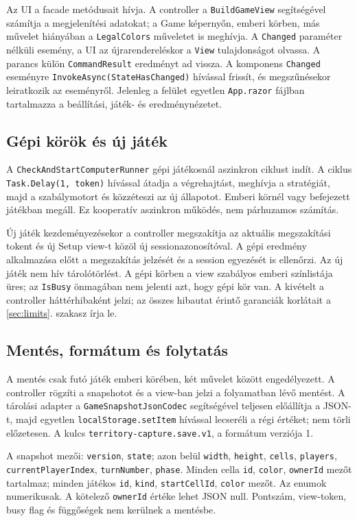 \documentclass[11pt,a4paper]{article}
\newcommand{\code}[1]{\nolinkurl{#1}}
\begin{document}
Az UI a facade metódusait hívja. A controller a \code{BuildGameView} segítségével számítja a megjelenítési adatokat; a Game képernyőn, emberi körben, más művelet hiányában a \code{LegalColors} műveletet is meghívja. A \code{Changed} paraméter nélküli esemény, a UI az újrarendereléskor a \code{View} tulajdonságot olvassa. A parancs külön \code{CommandResult} eredményt ad vissza. A komponens \code{Changed} eseményre \code{InvokeAsync(StateHasChanged)} hívással frissít, és megszűnésekor leiratkozik az eseményről. Jelenleg a felület egyetlen \code{App.razor} fájlban tartalmazza a beállítási, játék- és eredménynézetet.

\subsection{Gépi körök és új játék}
A \code{CheckAndStartComputerRunner} gépi játékosnál aszinkron ciklust indít. A ciklus \code{Task.Delay(1, token)} hívással átadja a végrehajtást, meghívja a stratégiát, majd a szabálymotort és közzéteszi az új állapotot. Emberi körnél vagy befejezett játékban megáll. Ez kooperatív aszinkron működés, nem párhuzamos számítás.

Új játék kezdeményezésekor a controller megszakítja az aktuális megszakítási tokent és új Setup view-t közöl új sessionazonosítóval. A gépi eredmény alkalmazása előtt a megszakítás jelzését és a session egyezését is ellenőrzi. Az új játék nem hív tárolótörlést. A gépi körben a view szabályos emberi színlistája üres; az \code{IsBusy} önmagában nem jelenti azt, hogy gépi kör van. A kivételt a controller háttérhibaként jelzi; az összes hibautat érintő garanciák korlátait a \ref{sec:limits}. szakasz írja le.

\subsection{Mentés, formátum és folytatás}
A mentés csak futó játék emberi körében, két művelet között engedélyezett. A controller rögzíti a snapshotot és a view-ban jelzi a folyamatban lévő mentést. A tárolási adapter a \code{GameSnapshotJsonCodec} segítségével teljesen előállítja a JSON-t, majd egyetlen \code{localStorage.setItem} hívással lecseréli a régi értéket; nem törli előzetesen. A kulcs \code{territory-capture.save.v1}, a formátum verziója 1.

A snapshot mezői: \code{version}, \code{state}; azon belül \code{width}, \code{height}, \code{cells}, \code{players}, \code{currentPlayerIndex}, \code{turnNumber}, \code{phase}. Minden cella \code{id}, \code{color}, \code{ownerId} mezőt tartalmaz; minden játékos \code{id}, \code{kind}, \code{startCellId}, \code{color} mezőt. Az enumok numerikusak. A kötelező \code{ownerId} értéke lehet JSON null. Pontszám, view-token, busy flag és függőségek nem kerülnek a mentésbe.
\end{document}
